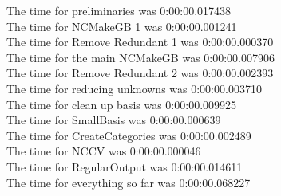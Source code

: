 \documentclass[rep10,leqno]{report}
\begin{document}
\noindent
The time for preliminaries was 0:00:00.017438\\
The time for NCMakeGB 1 was 0:00:00.001241\\
The time for Remove Redundant 1 was 0:00:00.000370\\
The time for the main NCMakeGB was 0:00:00.007906\\
The time for Remove Redundant 2 was 0:00:00.002393\\
The time for reducing unknowns was 0:00:00.003710\\
The time for clean up basis was 0:00:00.009925\\
The time for SmallBasis was 0:00:00.000639\\
The time for CreateCategories was 0:00:00.002489\\
The time for NCCV was 0:00:00.000046\\
The time for RegularOutput was 0:00:00.014611\\
The time for everything so far was 0:00:00.068227\\
\end{document}
